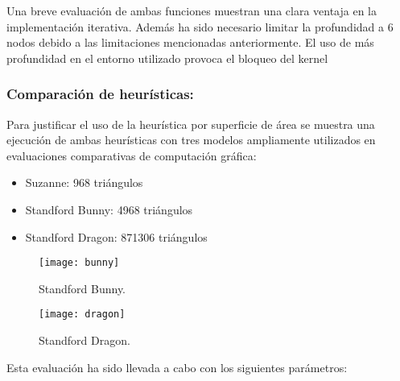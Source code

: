 Una breve evaluación de ambas funciones muestran una clara ventaja en la implementación iterativa. Además ha sido necesario limitar la profundidad a 6 nodos debido a las limitaciones mencionadas anteriormente. El uso de más profundidad en el entorno utilizado provoca el bloqueo del kernel



	
\subsubsection{Comparación de heurísticas:}
	
Para justificar el uso de la heurística por superficie de área se muestra una ejecución de ambas heurísticas con tres modelos ampliamente utilizados en evaluaciones comparativas de computación gráfica:

\begin{itemize}
	
	\item Suzanne: 968 triángulos
	\item Standford Bunny: 4968 triángulos
	\item Standford Dragon: 871306 triángulos
	
\end{itemize}

\begin{figure}[H]
	\centering
  \begin{minipage}[b]{0.4\textwidth}
    \texttt{[image: bunny]}
    \caption{Standford Bunny.}
  \end{minipage}
  \hfill
  \begin{minipage}[b]{0.4\textwidth}
    \texttt{[image: dragon]}
    \caption{Standford Dragon.}
  \end{minipage}
\end{figure}

Esta evaluación ha sido llevada a cabo con los siguientes parámetros:

